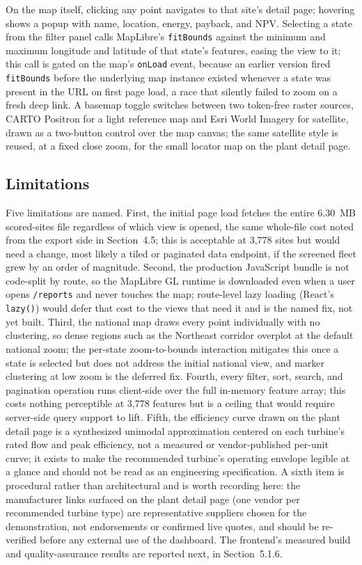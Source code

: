 \documentclass[12pt,letterpaper]{report}
\begin{document}
On the map itself, clicking any point navigates to that site's detail
page; hovering shows a popup with name, location, energy, payback, and
NPV. Selecting a state from the filter panel calls MapLibre's
\texttt{fitBounds} against the minimum and maximum longitude and latitude
of that state's features, easing the view to it; this call is gated on the
map's \texttt{onLoad} event, because an earlier version fired
\texttt{fitBounds} before the underlying map instance existed whenever a
state was present in the URL on first page load, a race that silently
failed to zoom on a fresh deep link. A basemap toggle switches between two
token-free raster sources, CARTO Positron for a light reference map and
Esri World Imagery for satellite, drawn as a two-button control over the
map canvas; the same satellite style is reused, at a fixed close zoom, for
the small locator map on the plant detail page.

\subsection{Limitations}

Five limitations are named. First, the initial page load fetches the
entire 6.30~MB scored-sites file regardless of which view is opened, the
same whole-file cost noted from the export side in Section~4.5; this is
acceptable at 3{,}778 sites but would need a change, most likely a
tiled or paginated data endpoint, if the screened fleet grew by an order of
magnitude. Second, the production JavaScript bundle is not code-split by
route, so the MapLibre GL runtime is downloaded even when a user opens
\texttt{/reports} and never touches the map; route-level lazy loading
(React's \texttt{lazy()}) would defer that cost to the views that need it
and is the named fix, not yet built. Third, the national map draws every
point individually with no clustering, so dense regions such as the
Northeast corridor overplot at the default national zoom; the per-state
zoom-to-bounds interaction mitigates this once a state is selected but does
not address the initial national view, and marker clustering at low zoom is
the deferred fix. Fourth, every filter, sort, search, and pagination
operation runs client-side over the full in-memory feature array; this
costs nothing perceptible at 3{,}778 features but is a ceiling that would
require server-side query support to lift. Fifth, the efficiency curve
drawn on the plant detail page is a synthesized unimodal approximation
centered on each turbine's rated flow and peak efficiency, not a measured
or vendor-published per-unit curve; it exists to make the recommended
turbine's operating envelope legible at a glance and should not be read as
an engineering specification. A sixth item is procedural rather than
architectural and is worth recording here: the manufacturer links surfaced
on the plant detail page (one vendor per recommended turbine type) are
representative suppliers chosen for the demonstration, not endorsements or
confirmed live quotes, and should be re-verified before any external use of
the dashboard. The frontend's measured build and quality-assurance results
are reported next, in Section~5.1.6.
\end{document}
